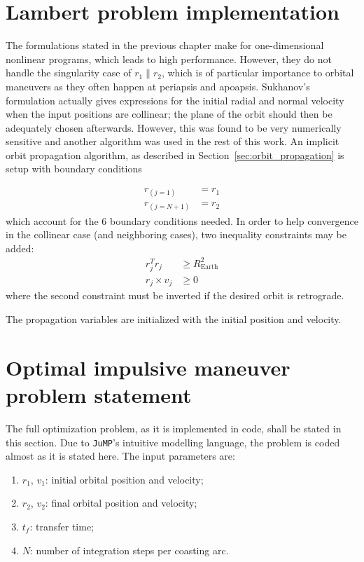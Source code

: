\section{Lambert problem implementation}

The formulations stated in the previous chapter make for one-dimensional nonlinear programs, which leads to high performance. However, they do not handle the singularity case of \(r_1 \parallel r_2\), which is of particular importance to orbital maneuvers as they often happen at periapsis and apoapsis. Sukhanov's formulation actually gives expressions for the initial radial and normal velocity when the input positions are collinear; the plane of the orbit should then be adequately chosen afterwards. However, this was found to be very numerically sensitive and another algorithm was used in the rest of this work. An implicit orbit propagation algorithm, as described in Section~\ref{sec:orbit_propagation} is setup with boundary conditions

\begin{align}
    r_{(j=1)} &= r_1 \\
    r_{(j=N+1)} &= r_2
\end{align}
which account for the 6 boundary conditions needed. In order to help convergence in the collinear case (and neighboring cases), two inequality constraints may be added:
\begin{align}
    r_j^T r_j &\geq R_{\text{Earth}}^2 \\
    r_j \times v_j &\geq 0
\end{align}
where the second constraint must be inverted if the desired orbit is retrograde. 

The propagation variables are initialized with the initial position and velocity.

\section{Optimal impulsive maneuver problem statement}\label{sec:impulsive_statement}

The full optimization problem, as it is implemented in code, shall be stated in this section. Due to \texttt{JuMP}'s intuitive modelling language, the problem is coded almost as it is stated here. The input parameters are:
\begin{enumerate}
    \item \(r_1\), \(v_1\): initial orbital position and velocity;
    \item \(r_2\), \(v_2\): final orbital position and velocity;
    \item \(t_f\): transfer time;
    \item \(N\): number of integration steps per coasting arc.
\end{enumerate}

